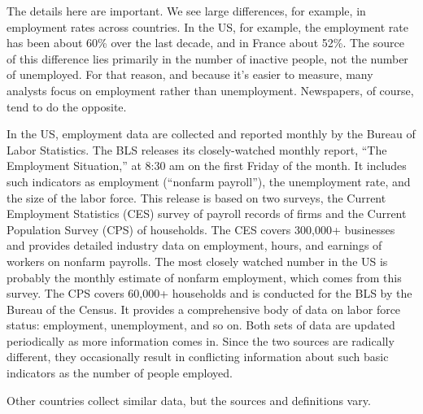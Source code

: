 \documentclass[letterpaper,12pt]{article}
\begin{document}
The details here are important.
We see large differences, for example, in employment rates across countries.
In the US, for example,
the employment rate has been about 60\% over the last decade,
and in France about 52\%.
The source of this difference lies primarily in the number of inactive
people, not the number of unemployed.
For that reason, and because it's easier to measure,
many analysts focus on employment rather than unemployment.
Newspapers, of course, tend to do the opposite.


In the US, employment data are collected and reported monthly by
the Bureau of Labor Statistics. The BLS releases its
closely-watched monthly report, ``The Employment Situation,'' at
8:30 am on the first Friday of the month.  It includes such
indicators as employment (``nonfarm payroll''),
the unemployment rate, and the size of the labor force.
This release is based on two surveys, the Current
Employment Statistics (CES) survey of payroll records of firms and
the Current Population Survey (CPS) of households. The CES covers
300,000+ businesses and provides detailed industry data on
employment, hours, and earnings of workers on nonfarm payrolls.
The most closely watched number in the US is probably the monthly
estimate of nonfarm employment, which comes from this survey.
The CPS covers 60,000+ households and is conducted for the BLS by
the Bureau of the Census. It provides a comprehensive body of data
on labor force status:  employment, unemployment, and so on.  Both
sets of data are updated periodically as more information comes
in.  Since the two sources are radically different,
they occasionally result in conflicting information about such
basic indicators as the number of people employed.

Other countries collect similar data, but the sources and definitions vary.

\begin{comment}
In a typical case, the categories are expanded as
follows: (ia)~employed in same job as last period, (ib)~employed
in different job, (ii)~unemployed, and (iii)~not in labor force.
Related information is collected from firms.  A firm is said to
create jobs if it lists more positions (filled or not) than in the
previous period and destroy jobs if there are fewer.  Total {\it
job creation\/} for the economy as a whole is the total number of
positions added by firms that create jobs.  Similarly, total {\it
job destruction\/} is the total number of positions lost by firms
that destroy jobs.  The astonishing feature of flow data is how
much churning goes on: millions of people gain and lose jobs every
month, and millions of jobs are created and destroyed, whether the
economy is growing or shrinking.
\end{comment}
\end{document}

